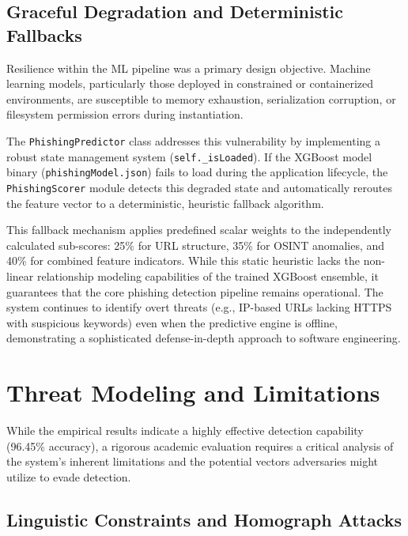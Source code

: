 \subsection{Graceful Degradation and Deterministic
Fallbacks}\label{graceful-degradation-and-deterministic-fallbacks}

Resilience within the ML pipeline was a primary design objective.
Machine learning models, particularly those deployed in constrained or
containerized environments, are susceptible to memory exhaustion,
serialization corruption, or filesystem permission errors during
instantiation.

The \texttt{PhishingPredictor} class addresses this vulnerability by
implementing a robust state management system
(\texttt{self.\_isLoaded}). If the XGBoost model binary
(\texttt{phishingModel.json}) fails to load during the application
lifecycle, the \texttt{PhishingScorer} module detects this degraded
state and automatically reroutes the feature vector to a deterministic,
heuristic fallback algorithm.

This fallback mechanism applies predefined scalar weights to the
independently calculated sub-scores: 25\% for URL structure, 35\% for
OSINT anomalies, and 40\% for combined feature indicators. While this
static heuristic lacks the non-linear relationship modeling capabilities
of the trained XGBoost ensemble, it guarantees that the core phishing
detection pipeline remains operational. The system continues to identify
overt threats (e.g., IP-based URLs lacking HTTPS with suspicious
keywords) even when the predictive engine is offline, demonstrating a
sophisticated defense-in-depth approach to software engineering.

\section{Threat Modeling and
Limitations}\label{threat-modeling-and-limitations}

While the empirical results indicate a highly effective detection
capability (96.45\% accuracy), a rigorous academic evaluation requires a
critical analysis of the system's inherent limitations and the potential
vectors adversaries might utilize to evade detection.

\subsection{Linguistic Constraints and Homograph
Attacks}\label{linguistic-constraints-and-homograph-attacks}

